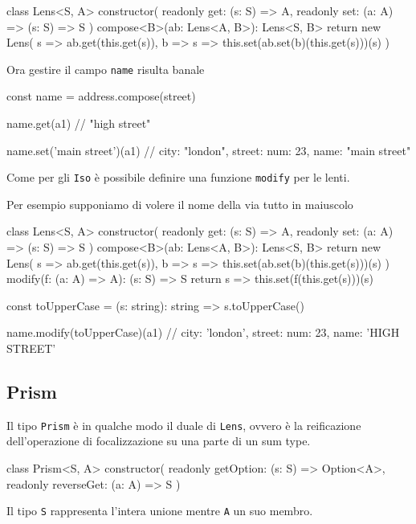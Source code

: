 \documentclass[12pt]{article}
\theoremstyle{definition}
\newenvironment{code}
  {\vspace{0.5cm} \VerbatimEnvironment\begin{typescriptcode}}
  {\end{typescriptcode} \vspace{0.2cm}}
\begin{document}
\begin{code}
class Lens<S, A> {
  constructor(
    readonly get: (s: S) => A,
    readonly set: (a: A) => (s: S) => S
  ) {}
  compose<B>(ab: Lens<A, B>): Lens<S, B> {
    return new Lens(
      s => ab.get(this.get(s)),
      b => s => this.set(ab.set(b)(this.get(s)))(s)
    )
  }
}
\end{code}

Ora gestire il campo \texttt{name} risulta banale

\begin{code}
const name = address.compose(street)

name.get(a1)
// "high street"

name.set('main street')(a1)
// { city: "london", street: { num: 23, name: "main street" } }
\end{code}

Come per gli \texttt{Iso} è possibile definire una funzione \texttt{modify} per le lenti.

Per esempio supponiamo di volere il nome della via tutto in maiuscolo

\begin{code}
class Lens<S, A> {
  constructor(
    readonly get: (s: S) => A,
    readonly set: (a: A) => (s: S) => S
  ) {}
  compose<B>(ab: Lens<A, B>): Lens<S, B> {
    return new Lens(
      s => ab.get(this.get(s)),
      b => s => this.set(ab.set(b)(this.get(s)))(s)
    )
  }
  modify(f: (a: A) => A): (s: S) => S {
    return s => this.set(f(this.get(s)))(s)
  }
}

const toUpperCase = (s: string): string => s.toUpperCase()

name.modify(toUpperCase)(a1)
// { city: 'london', street: { num: 23, name: 'HIGH STREET' } }
\end{code}

\subsection{Prism}

Il tipo \texttt{Prism} è in qualche modo il duale di \texttt{Lens}, ovvero è la reificazione dell'operazione di focalizzazione
su una parte di un sum type.

\begin{code}
class Prism<S, A> {
  constructor(
    readonly getOption: (s: S) => Option<A>,
    readonly reverseGet: (a: A) => S
  ) {}
}
\end{code}

Il tipo \texttt{S} rappresenta l'intera unione mentre \texttt{A} un suo membro.
\end{document}
